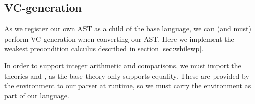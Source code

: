 \subsection{VC-generation}

As we register our own AST as a child of the base language,
we can (and must) perform VC-generation when converting our AST.
Here we implement the weakest precondition calculus described in section \ref{sec:whilewp}.

In order to support integer arithmetic and comparisons,
we must import the theories  and ,
as the base theory only supports equality.
These are provided by the environment to our parser at runtime,
so we must carry the environment as part of our language.
